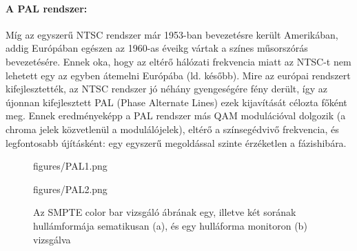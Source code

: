 \paragraph{A PAL rendszer:}
Míg az egyszerű NTSC rendszer már 1953-ban bevezetésre került Amerikában, addig Európában egészen az 1960-as éveikg vártak a színes műsorszórás bevezetésére.
Ennek oka, hogy az eltérő hálózati frekvencia miatt az NTSC-t nem lehetett egy az egyben átemelni Európába (ld. később).
Mire az európai rendszert kifejlesztették, az NTSC rendszer jó néhány gyengeségére fény derült, így az újonnan kifejlesztett PAL (Phase Alternate Lines) ezek kijavítását célozta főként meg.
Ennek eredményeképp a PAL rendszer más QAM modulációval dolgozik (a chroma jelek közvetlenül a modulálójelek), eltérő a színsegédvivő frekvencia, és legfontosabb újításként: egy egyszerű megoldással szinte érzéketlen a fázishibára.
\begin{figure}[]
	\centering
	\begin{overpic}[width = 0.45\columnwidth ]{figures/PAL1.png}
	\end{overpic} \hfill
	\begin{overpic}[width = 0.45\columnwidth ]{figures/PAL2.png}
	\end{overpic} \hfill
	\caption{Az SMPTE color bar vizsgáló ábrának egy, illetve két sorának hullámformája sematikusan (a), és egy hulláforma monitoron (b) vizsgálva}
	\label{Fig:PAL1}
\end{figure}

